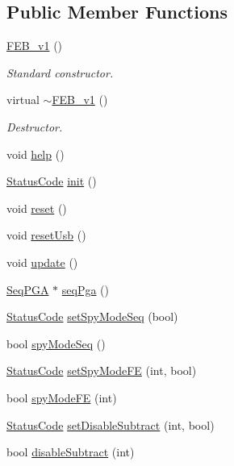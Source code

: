 \subsection*{Public Member Functions}
\begin{DoxyCompactItemize}
\item 
\hyperlink{classFEB__v1_aad65ff3d95f3f60583dad914f9c18a9d}{F\+E\+B\+\_\+v1} ()
\begin{DoxyCompactList}\small\item\em Standard constructor. \end{DoxyCompactList}\item 
virtual \hyperlink{classFEB__v1_a655c6fb31068c4dbb7fde34de77a5a49}{$\sim$\+F\+E\+B\+\_\+v1} ()
\begin{DoxyCompactList}\small\item\em Destructor. \end{DoxyCompactList}\item 
void \hyperlink{classFEB__v1_af93db546ad89ba7c2301fdc2314efd8a}{help} ()
\item 
\hyperlink{classStatusCode}{Status\+Code} \hyperlink{classFEB__v1_a70d7d266c7d05fdfab21d5b0293f1ad8}{init} ()
\item 
void \hyperlink{classFEB__v1_a4e147b894ecbf4b05b92d01270d7ff13}{reset} ()
\item 
void \hyperlink{classFEB__v1_aa545951bdeab3e1dd600336c313c7769}{reset\+Usb} ()
\item 
void \hyperlink{classFEB__v1_a96ad348b7be37686998c0eaa7fd2e83e}{update} ()
\item 
\hyperlink{classSeqPGA}{Seq\+P\+GA} $\ast$ \hyperlink{classFEB__v1_a8bf655504f9b0c51d5aa5bc6b30da00d}{seq\+Pga} ()
\item 
\hyperlink{classStatusCode}{Status\+Code} \hyperlink{classFEB__v1_a9e13da349fc335ec44032fa0426c40d0}{set\+Spy\+Mode\+Seq} (bool)
\item 
bool \hyperlink{classFEB__v1_a3ec8b74aedfbe5e3d3ce0d4b4eb44330}{spy\+Mode\+Seq} ()
\item 
\hyperlink{classStatusCode}{Status\+Code} \hyperlink{classFEB__v1_ab88d23abb96f746298e0fa1e1cf63e3e}{set\+Spy\+Mode\+FE} (int, bool)
\item 
bool \hyperlink{classFEB__v1_a0b6d25515e575e370552c6b6f715fd76}{spy\+Mode\+FE} (int)
\item 
\hyperlink{classStatusCode}{Status\+Code} \hyperlink{classFEB__v1_a067a0aeae34dbd782547afbcd82fc77f}{set\+Disable\+Subtract} (int, bool)
\item 
bool \hyperlink{classFEB__v1_a3d224acca0807603d14b72cff6359b3f}{disable\+Subtract} (int)

\end{DoxyCompactItemize}
